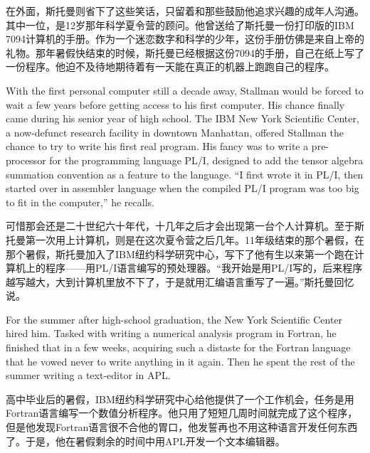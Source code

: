 \ifdefined\chs
在外面，斯托曼则省下了这些笑话，只留着和那些鼓励他追求兴趣的成年人沟通。其中一位，是12岁那年科学夏令营的顾问。他曾送给了斯托曼一份打印版的IBM 7094计算机的手册。作为一个迷恋数字和科学的少年，这份手册仿佛是来自上帝的礼物。那年暑假快结束的时候，斯托曼已经根据这份7094的手册，自己在纸上写了一份程序。他迫不及待地期待着有一天能在真正的机器上跑跑自己的程序。
\fi

\ifdefined\eng
With the first personal computer still a decade away, Stallman would be forced to wait a few years before getting access to his first computer. His chance finally came during his senior year of high school.  The IBM New York Scientific Center, a now-defunct research facility in downtown Manhattan, offered Stallman the chance to try to write his first real program.  His fancy was to write a pre-processor for the programming language PL/I, designed to add the tensor algebra summation convention as a feature to the language. ``I first wrote it in PL/I, then started over in assembler language when the compiled PL/I program was too big to fit in the computer,'' he recalls.
\fi

\ifdefined\chs
可惜那会还是二十世纪六十年代，十几年之后才会出现第一台个人计算机。至于斯托曼第一次用上计算机，则是在这次夏令营之后几年。11年级结束的那个暑假，在那个暑假，斯托曼加入了IBM纽约科学研究中心，写下了他有生以来第一个跑在计算机上的程序——用PL/I语言编写的预处理器。``我开始是用PL/I写的，后来程序越写越大，大到计算机里放不下了，于是就用汇编语言重写了一遍。''斯托曼回忆说。
\fi

\ifdefined\eng
For the summer after high-school graduation, the New York Scientific Center hired him.  Tasked with writing a numerical analysis program in Fortran, he finished that in a few weeks, acquiring such a distaste for the Fortran language that he vowed never to write anything in it again.  Then he spent the rest of the summer writing a text-editor in APL.
\fi

\ifdefined\chs
高中毕业后的暑假，IBM纽约科学研究中心给他提供了一个工作机会，任务是用Fortran语言编写一个数值分析程序。他只用了短短几周时间就完成了这个程序，但是他发现Fortran语言很不合他的胃口，他发誓再也不用这种语言开发任何东西了。于是，他在暑假剩余的时间中用APL开发一个文本编辑器。
\fi

